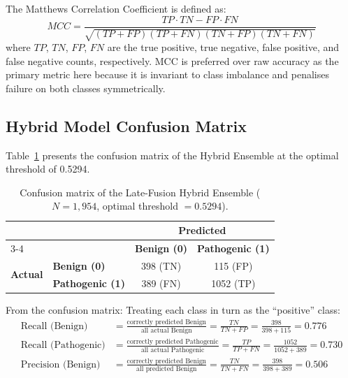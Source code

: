 \documentclass[12pt,a4paper]{article}
\begin{document}
\noindent
The Matthews Correlation Coefficient is defined as:
\begin{equation}
MCC = \frac{TP \cdot TN - FP \cdot FN}
           {\sqrt{(TP+FP)(TP+FN)(TN+FP)(TN+FN)}}
\label{eq:mcc}
\end{equation}
where $TP$, $TN$, $FP$, $FN$ are the true positive, true negative, false
positive, and false negative counts, respectively. MCC is preferred over
raw accuracy as the primary metric here because it is invariant to class
imbalance and penalises failure on both classes symmetrically.

\subsection{Hybrid Model Confusion Matrix}
\label{subsec:cm}

Table~\ref{tab:cm} presents the confusion matrix of the Hybrid Ensemble at
the optimal threshold of 0.5294.

\begin{table}[H]
\centering
\caption{Confusion matrix of the Late-Fusion Hybrid Ensemble
         ($N = 1{,}954$, optimal threshold $= 0.5294$).}
\label{tab:cm}
\begin{tabular}{@{}llcc@{}}
\toprule
& & \multicolumn{2}{c}{\textbf{Predicted}} \\
\cmidrule(l){3-4}
& & \textbf{Benign (0)} & \textbf{Pathogenic (1)} \\
\midrule
\multirow{2}{*}{\textbf{Actual}}
  & \textbf{Benign (0)}     & 398 (TN) & 115 (FP) \\
  & \textbf{Pathogenic (1)} & 389 (FN) & 1052 (TP) \\
\bottomrule
\end{tabular}
\end{table}

\noindent
From the confusion matrix:
\noindent
Treating each class in turn as the ``positive'' class:
\begin{align}
\text{Recall (Benign)}
  &= \frac{\text{correctly predicted Benign}}{\text{all actual Benign}}
   = \frac{TN}{TN + FP} = \frac{398}{398+115} = 0.776 \label{eq:rec_b}\\
\text{Recall (Pathogenic)}
  &= \frac{\text{correctly predicted Pathogenic}}{\text{all actual Pathogenic}}
   = \frac{TP}{TP + FN} = \frac{1052}{1052+389} = 0.730 \label{eq:rec_p}\\
\text{Precision (Benign)}
  &= \frac{\text{correctly predicted Benign}}{\text{all predicted Benign}}
   = \frac{TN}{TN + FN} = \frac{398}{398+389} = 0.506 \label{eq:prec_b}
\end{align}
\end{document}
